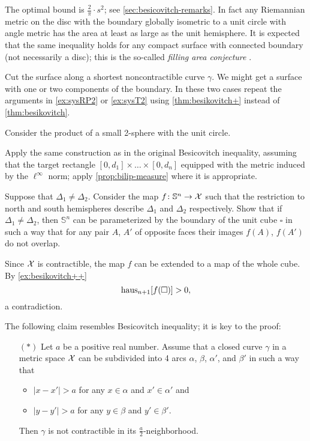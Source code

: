 The optimal bound is $\tfrac2 \pi\cdot s^2$; see  \ref{sec:besicovitch-remarks}.
In fact any Riemannian metric on the disc with the boundary globally isometric to a unit circle with angle metric has the area at least as large as the unit hemisphere.
It is expected that the same inequality holds for any compact surface with connected boundary (not necessarily a disc);
this is the so-called \emph{filling area conjecture} \cite[it is mentioned Mikhael Gromov in 5.5.$\mathrm{B}'(\mathrm{e}')$ of][]{gromov-1983}.

 Cut the surface along a shortest noncontractible curve $\gamma$. 
We might get a surface with one or two components of the boundary.
In these two cases repeat the arguments in \ref{ex:sysRP2} or \ref{ex:sysT2} using \ref{thm:besikovitch+} instead of \ref{thm:besikovitch}.


 Consider the product of a small 2-sphere with the unit circle.

Apply the same construction as in the original Besicovitch inequality, assuming that the target rectangle
$[0,d_1]\times\dots\times [0,d_n]$ equipped with the metric induced by the $\ell^\infty$ norm;
apply \ref{prop:bilip-measure} where it is appropriate.

 Suppose that $\Delta_1\ne\Delta_2$.
Consider the map $f\colon\mathbb{S}^n\to \mathcal{X}$ such that the restriction to north and south hemispheres describe $\Delta_1$ and $\Delta_2$ respectively.
Show that if $\Delta_1\ne\Delta_2$, then $\mathbb{S}^n$ can be parameterized by the boundary of the unit cube $\square$ in such a way that for any pair $A$, $A'$ of opposite faces their images $f(A)$, $f(A')$ do not overlap.

Since $\mathcal{X}$ is contractible, the map $f$ can be extended to a map of the whole cube.
By \ref{ex:besikovitch++} 
\[\mathrm{haus}_{n+1}[f(\square)]>0,\]
a contradiction.

\setcounter{eqtn}{0}

The following claim resembles Besicovitch inequality;
it is key to the proof:
\begin{itemize}
 \item[$({*})$] Let $a$ be a positive real number.
 Assume that a closed curve $\gamma$ in a metric space $\mathcal{X}$ can be subdivided into 4 arcs $\alpha$, $\beta$, $\alpha'$, and $\beta'$ in such a way that 
 \begin{itemize}
 \item $|x-x'|>a$ for any $x\in\alpha$ and $x'\in \alpha'$
 and
 \item $|y-y'|>a$ for any $y\in\beta$ and $y'\in \beta'$.
 \end{itemize}
 Then $\gamma$ is not contractible in its $\tfrac a2$-neighborhood.
\end{itemize}

